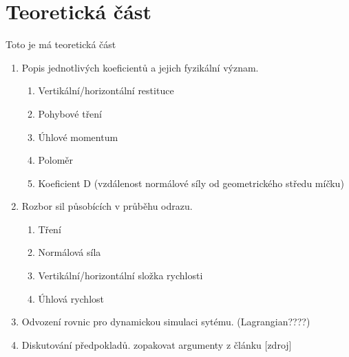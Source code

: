 \part{Teoretická část}
\label{part:teoreticka-cast}
Toto je má teoretická část
\begin{enumerate}
\item Popis jednotlivých koeficientů a jejich fyzikální význam.
 \begin{enumerate}
  \item Vertikální/horizontální restituce
  \item Pohybové tření
  \item Úhlové momentum
  \item Poloměr
  \item Koeficient D (vzdálenost normálové síly od geometrického středu míčku)
 \end{enumerate}
 \item Rozbor sil působících v průběhu odrazu.
 \begin{enumerate}
  \item Tření
  \item Normálová síla
  \item Vertikální/horizontální složka rychlosti
  \item Úhlová rychlost
 \end{enumerate} 
 \item Odvození rovnic pro dynamickou simulaci sytému. (Lagrangian????)
 \item Diskutování předpokladů. zopakovat argumenty z článku [zdroj]
\end{enumerate}


